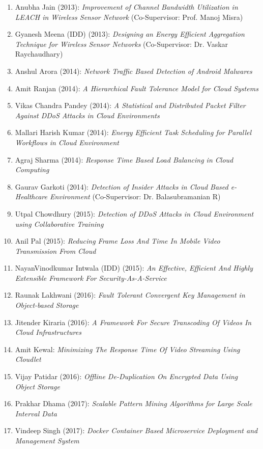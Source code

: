 \begin{enumerate} [label=(MT\arabic*).]
\item		Anubha Jain (2013): 	\textit{	 Improvement of Channel Bandwidth Utilization in LEACH in Wireless Sensor Network} (Co-Supervisor:	Prof. Manoj Misra)	
\item		Gyanesh Meena (IDD) (2013): 	\textit{	Designing an Energy Efficient Aggregation Technique for Wireless Sensor Networks} (Co-Supervisor: Dr. Vaskar Raychaudhary)
\item		Anshul Arora (2014): 	\textit{	Network Traffic Based Detection of Android Malwares}	
\item		Amit Ranjan (2014): 	\textit{	A Hierarchical Fault Tolerance Model for Cloud Systems}	
\item     Vikas Chandra Pandey (2014): 	\textit{ A Statistical and Distributed Packet Filter Against DDoS Attacks in Cloud Environments} 
\item		Mallari Harish Kumar (2014): 	\textit{	Energy Efficient Task Scheduling for Parallel Workflows in Cloud Environment}	
\item		Agraj Sharma (2014): 	\textit{	Response Time Based Load Balancing in Cloud Computing} 
\item		Gaurav Garkoti (2014): 	\textit{	Detection of Insider Attacks in Cloud Based e-Healthcare Environment} (Co-Supervisor: Dr. Balasubramanian R)
\item		Utpal Chowdhury (2015): 	\textit{	Detection of DDoS Attacks in Cloud Environment using Collaborative Training}
\item		Anil Pal (2015): 	\textit{	Reducing Frame Loss And Time In Mobile Video Transmission From Cloud}	
\item		NayanVinodkumar Intwala (IDD) (2015): 	\textit{	An Effective, Efficient And Highly Extensible Framework For Security-As-A-Service}	
\item		Raunak Lakhwani (2016): 	\textit{Fault Tolerant Convergent Key Management in Object-based Storage}
\item		Jitender Kiraria (2016): 	\textit{	A Framework For Secure Transcoding Of Videos In Cloud Infrastructures}
\item		Amit Kewal: 	\textit{	Minimizing The Response Time Of Video Streaming Using Cloudlet}
\item		Vijay Patidar (2016): 	\textit{	Offline De-Duplication On Encrypted Data Using Object Storage}	
\item		Prakhar Dhama (2017): 	\textit{	Scalable Pattern Mining Algorithms for Large Scale Interval Data}
\item		Vindeep Singh (2017): 	\textit{	Docker Container Based Microservice Deployment and Management System}	

\end{enumerate}
